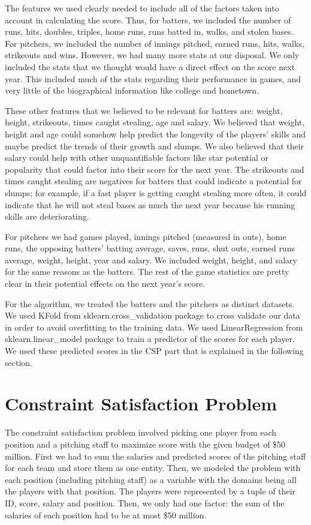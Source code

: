 \documentclass[12pt]{amsart}
\begin{document}
The features we used clearly needed to include all of the factors taken into account in calculating the score. Thus, for batters, we included the number of runs, hits, doubles, triples, home runs, runs batted in, walks, and stolen bases. For pitchers, we included the number of innings pitched, earned runs, hits, walks, strikeouts and wins. However, we had many more stats at our disposal. We only included the stats that we thought would have a direct effect on the score next year. This included much of the stats regarding their performance in games, and very little of the biographical information like college and hometown. 
\vspace{.4cm}

These other features that we believed to be relevant for batters are: weight, height, strikeouts, times caught stealing, age and salary. We believed that weight, height and age could somehow help predict the longevity of the players' skills and maybe predict the trends of their growth and slumps. We also believed that their salary could help with other unquantifiable factors like star potential or popularity that could factor into their score for the next year. The strikeouts and times caught stealing are negatives for batters that could indicate a potential for slumps; for example, if a fast player is getting caught stealing more often, it could indicate that he will not steal bases as much the next year because his running skills are deteriorating. 
\vspace{.4cm}

For pitchers we had games played, innings pitched (measured in outs), home runs, the opposing batters' batting average, saves, runs, shut outs, earned runs average, weight, height, year and salary. We included weight, height, and salary for the same reasons as the batters. The rest of the game statistics are pretty clear in their potential effects on the next year's score. 
\vspace{.4cm}

For the algorithm, we treated the batters and the pitchers as distinct datasets. We used KFold from sklearn.cross\_validation package to cross validate our data in order to avoid overfitting to the training data. We used LinearRegression from sklearn.linear\_model package to train a predictor of the scores for each player. We used these predicted scores in the CSP part that is explained in the following section.
\section{\large Constraint Satisfaction Problem}
The constraint satisfaction problem involved picking one player from each position and a pitching staff to maximize score with the given budget of \$50 million. First we had to sum the salaries and predicted scores of the pitching staff for each team and store them as one entity. Then, we modeled the problem with each position (including pitching staff) as a variable with the domains being all the players with that position. The players were represented by a tuple of their ID, score, salary and position. Then, we only had one factor: the sum of the salaries of each position had to be at most \$50 million.
\vspace{.4cm}
\end{document}
